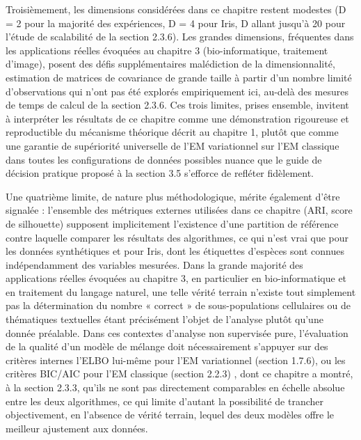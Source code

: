 Troisièmement, les dimensions considérées dans ce chapitre restent modestes (D = 2 pour la majorité des expériences, D = 4 pour Iris, D allant jusqu'à 20 pour l'étude de scalabilité de la section 2.3.6). Les grandes dimensions, fréquentes dans les applications réelles évoquées au chapitre 3 (bio-informatique, traitement d'image), posent des défis supplémentaires  malédiction de la dimensionnalité, estimation de matrices de covariance de grande taille à partir d'un nombre limité d'observations  qui n'ont pas été explorés empiriquement ici, au-delà des mesures de temps de calcul de la section 2.3.6. Ces trois limites, prises ensemble, invitent à interpréter les résultats de ce chapitre comme une démonstration rigoureuse et reproductible du mécanisme théorique décrit au chapitre 1, plutôt que comme une garantie de supériorité universelle de l'EM variationnel sur l'EM classique dans toutes les configurations de données possibles  nuance que le guide de décision pratique proposé à la section 3.5 s'efforce de refléter fidèlement.

Une quatrième limite, de nature plus méthodologique, mérite également d'être signalée : l'ensemble des métriques externes utilisées dans ce chapitre (ARI, score de silhouette) supposent implicitement l'existence d'une partition de référence contre laquelle comparer les résultats des algorithmes, ce qui n'est vrai que pour les données synthétiques et pour Iris, dont les étiquettes d'espèces sont connues indépendamment des variables mesurées. Dans la grande majorité des applications réelles évoquées au chapitre 3, en particulier en bio-informatique et en traitement du langage naturel, une telle vérité terrain n'existe tout simplement pas  la détermination du nombre « correct » de sous-populations cellulaires ou de thématiques textuelles étant précisément l'objet de l'analyse plutôt qu'une donnée préalable. Dans ces contextes d'analyse non supervisée pure, l'évaluation de la qualité d'un modèle de mélange doit nécessairement s'appuyer sur des critères internes  l'ELBO lui-même pour l'EM variationnel (section 1.7.6), ou les critères BIC/AIC pour l'EM classique (section 2.2.3) , dont ce chapitre a montré, à la section 2.3.3, qu'ils ne sont pas directement comparables en échelle absolue entre les deux algorithmes, ce qui limite d'autant la possibilité de trancher objectivement, en l'absence de vérité terrain, lequel des deux modèles offre le meilleur ajustement aux données.

